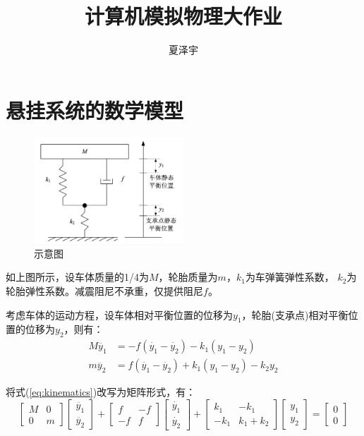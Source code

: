 \documentclass[UTF8, a4paper]{ctexart}
\title{计算机模拟物理大作业}
\author{夏泽宇}
\begin{document}
\maketitle
\section{悬挂系统的数学模型}

\begin{figure}[h]
    \centering
    \includegraphics[width=0.5\textwidth]{../fig/schematic.jpeg}
    \caption{示意图}
    \label{fig:schematic}
\end{figure}
如上图所示，设车体质量的1/4为$M$，轮胎质量为$m$，$k_1$为车弹簧弹性系数，
$k_2$为轮胎弹性系数。减震阻尼不承重，仅提供阻尼$f$。

考虑车体的运动方程，设车体相对平衡位置的位移为$y_1$，轮胎(支承点)相对平衡位置的位移为$y_2$，则有：
\begin{equation}
    \begin{aligned}
        M\ddot{y_1} &= -f(\dot{y_1}-\dot{y_2}) - k_1(y_1 - y_2)\\
        m\ddot{y_2} &= f(\dot{y_1}-\dot{y_2}) + k_1(y_1 - y_2) - k_2y_2
    \end{aligned}
    \label{eq:kinematics}
\end{equation}

将式(\ref{eq:kinematics})改写为矩阵形式，有：
\[
\begin{bmatrix}
    M & 0 \\
    0 & m
\end{bmatrix}
\begin{bmatrix}
    \ddot{y_1} \\
    \ddot{y_2}
\end{bmatrix}
+
\begin{bmatrix}
    f & -f \\
    -f & f
\end{bmatrix}
\begin{bmatrix}
    \dot{y_1} \\
    \dot{y_2}
\end{bmatrix}
+
\begin{bmatrix}
    k_1 & -k_1 \\
    -k_1 & k_1 + k_2
\end{bmatrix}
\begin{bmatrix}
    y_1 \\
    y_2
\end{bmatrix}
=
\begin{bmatrix}
    0 \\
    0
\end{bmatrix}
\]
\end{document}
